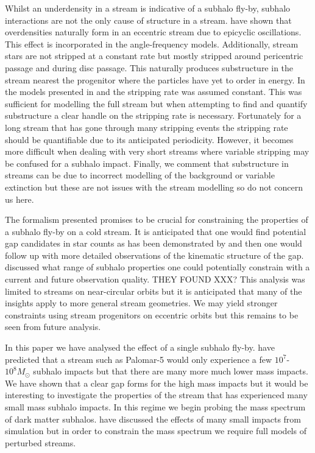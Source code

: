 \documentclass[useAMS,usenatbib,fleqn,a4paper]{mn2e}
\begin{document}
Whilst an underdensity in a stream is indicative of a subhalo fly-by, subhalo interactions are not the only cause of structure in a stream. \cite{Kupper2010} have shown that overdensities naturally form in an eccentric stream due to epicyclic oscillations. This effect is incorporated in the angle-frequency models. Additionally, stream stars are not stripped at a constant rate but mostly stripped around pericentric passage and during disc passage. This naturally produces substructure in the stream nearest the progenitor where the particles have yet to order in energy. In the models presented in \cite{Bovy2014} and \cite{Sanders2014} the stripping rate was assumed constant. This was sufficient for modelling the full stream but when attempting to find and quantify substructure a clear handle on the stripping rate is necessary. Fortunately for a long stream that has gone through many stripping events the stripping rate should be quantifiable due to its anticipated periodicity. However, it becomes more difficult when dealing with very short streams where variable stripping may be confused for a subhalo impact. Finally, we comment that substructure in streams can be due to incorrect modelling of the background or variable extinction but these are not issues with the stream modelling so do not concern us here.

The formalism presented promises to be crucial for constraining the properties of a subhalo fly-by on a cold stream. It is anticipated that one would find potential gap candidates in star counts as has been demonstrated by \cite{Carlberg2013} and then one would follow up with more detailed observations of the kinematic structure of the gap. \cite{ErkalBelokurov2015b} discussed what range of subhalo properties one could potentially constrain with a current and future observation quality. THEY FOUND XXX? This analysis was limited to streams on near-circular orbits but it is anticipated that many of the insights apply to more general stream geometries. We may yield stronger constraints using stream progenitors on eccentric orbits but this remains to be seen from future analysis.

In this paper we have analysed the effect of a single subhalo fly-by. \cite{YoonJohnstonHogg} have predicted that a stream such as Palomar-5 would only experience a few $10^7$-$10^8M_\odot$ subhalo impacts but that there are many more much lower mass impacts. We have shown that a clear gap forms for the high mass impacts but it would be interesting to investigate the properties of the stream that has experienced many small mass subhalo impacts. In this regime we begin probing the mass spectrum of dark matter subhalos. \cite{Carlberg2013} \cite{NganCarlberg2014} have discussed the effects of many small impacts from simulation but in order to constrain the mass spectrum we require full models of perturbed streams.
\end{document}
